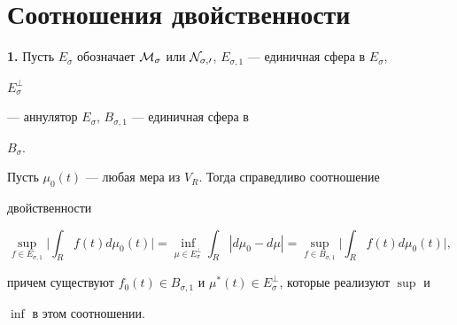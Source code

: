  


\section{Соотношения двойственности} 


 


{\bf 1.} Пусть $E_\sigma$ обозначает $\cal M_\sigma$ или $\cal 


N_{\sigma,0}$, $E_{\sigma,1}$ --- единичная сфера в $E_\sigma$, 


$E^\bot_\sigma$ 


--- аннулятор $E_\sigma$, $B_{\sigma,1}$ --- единичная сфера в 


$B_\sigma$. 


 


\begin{thm} 


Пусть $\mu_0(t)$ --- любая мера из $V_R$. Тогда справедливо соотношение 


двойственности 


\begin{equation} 


\sup_{f\in E_{\sigma,1}}\bigg|\int_R f(t)d\mu_0(t)\bigg|= 


\inf_{\mu\in E^\bot_\sigma}\int_R|d\mu_0-d\mu|= 


\sup_{f\in B_{\sigma,1}}\bigg|\int_R f(t)d\mu_0(t)\bigg|, 


\end{equation} 


причем существуют $f_0(t)\in B_{\sigma,1}$ и $\mu^*(t)\in 


E^\bot_\sigma$, которые реализуют $\sup$ и 


$\inf$ в этом соотношении. 


\end{thm} 


 


